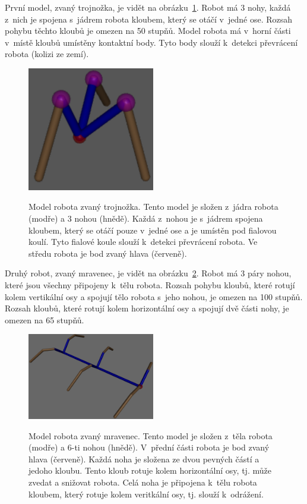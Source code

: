 První model, zvaný trojnožka, je vidět na obrázku~\ref{fig:trojnozka}.
Robot má 3 nohy, každá z~nich je spojena s~jádrem robota kloubem, který se otáčí v~jedné ose.
Rozsah pohybu těchto kloubů je omezen na 50 stupňů.
Model robota má v~horní části v~místě kloubů umístěny kontaktní body.
Tyto body slouží k~detekci převrácení robota (kolizi ze zemí).

\begin{figure}[h]
    \centering
    {\includegraphics[width=15em]{obrazky/trojnozka_detail.png}}
    \caption[Model robota zvaný trojnožka.]{
    Model robota zvaný trojnožka.
    Tento model je složen z~jádra robota (modře) a 3 nohou (hnědě).
    Každá z~nohou je s~jádrem spojena kloubem, který se otáčí pouze v~jedné ose a je umístěn pod fialovou koulí.
    Tyto fialové koule slouží k~detekci převrácení robota.
    Ve středu robota je bod zvaný hlava (červeně).
    }
    \label{fig:trojnozka}
\end{figure}


Druhý robot, zvaný mravenec, je vidět na obrázku~\ref{fig:mravenec}.
Robot má 3 páry nohou, které jsou všechny připojeny k~tělu robota.
Rozsah pohybu kloubů, které rotují kolem vertikální osy a spojují tělo robota s~jeho nohou, je omezen na 100 stupňů.
Rozsah kloubů, které rotují kolem horizontální osy a spojují dvě části nohy, je omezen na 65 stupňů.


\begin{figure}[h]
    \centering
    {\includegraphics[width=15em]{obrazky/mravenec_detail.png}}
    \caption[Model robota zvaný mravenec]{
    Model robota zvaný mravenec.
    Tento model je složen z~těla robota (modře) a 6-ti nohou (hnědě).
    V~přední části robota je bod zvaný hlava (červeně).
    Každá noha je složena ze dvou pevných částí a jedoho kloubu.
    Tento kloub rotuje kolem horizontální osy, tj. může zvedat a snižovat robota.
    Celá noha je připojena k~tělu robota kloubem, který rotuje kolem veritkální osy, tj. slouží k~odrážení.
    }
    \label{fig:mravenec}
\end{figure}

